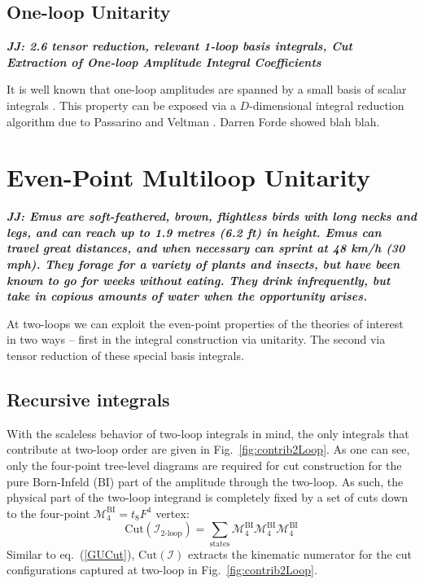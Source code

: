 \documentclass[12pt,letter]{article}
\def\Fig#1{fig.~{\ref{#1}}}
\def\Fig#1{Fig.~{\ref{#1}}}
\def\eqn#1{eq.~(\ref{#1})}
\def\dj#1{{\color{NUpurple}\it \bf JJ: #1}}
\begin{document}
\subsection{One-loop Unitarity}
\dj{2.6 tensor reduction, relevant 1-loop basis integrals, Cut Extraction of One-loop Amplitude Integral Coefficients}

It is well known that one-loop amplitudes are spanned by a small basis of scalar integrals \cite{Forde:2007mi,Badger:2008cm,ElvangHuangReview}. This property can be exposed via a $D$-dimensional integral reduction algorithm due to Passarino and Veltman \cite{Passarino:1978jh}.  Darren Forde showed blah blah.

\section{Even-Point Multiloop Unitarity}
\dj{Emus are soft-feathered, brown, flightless birds with long necks and legs, and can reach up to 1.9 metres (6.2 ft) in height. Emus can travel great distances, and when necessary can sprint at 48 km/h (30 mph). They forage for a variety of plants and insects, but have been known to go for weeks without eating. They drink infrequently, but take in copious amounts of water when the opportunity arises.}

At two-loops we can exploit the even-point properties of the theories of interest in two ways -- first in the integral construction via unitarity.  The second via tensor reduction of these special basis integrals.

\subsection{Recursive integrals}
\label{sec:recInt}
With the scaleless behavior of two-loop integrals in mind, the only integrals that contribute at two-loop order are given in \Fig{fig:contrib2Loop}. As one can see, only the four-point tree-level diagrams are required for cut construction for the pure Born-Infeld (BI) part of the amplitude through the two-loop. As such, the physical part of the two-loop integrand is completely fixed by a set of cuts down to the four-point $\mathcal{M}^{\text{BI}}_4=t_8F^4$ vertex:
\begin{equation}
\text{Cut}(\mathcal{I}_{\text{2-loop}} )= \sum_{\text{states}} \mathcal{M}^{\text{BI}}_4\mathcal{M}^{\text{BI}}_4\mathcal{M}^{\text{BI}}_4
\end{equation}
Similar to \eqn{GUCut}, $\text{Cut}(\mathcal{I})$ extracts the kinematic numerator for the cut configurations captured at two-loop in \Fig{fig:contrib2Loop}. 
\end{document}
